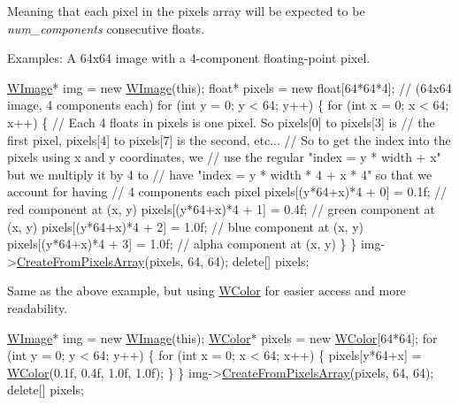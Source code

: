 Meaning that each pixel in the pixels array will be expected to be {\itshape num\+\_\+components} consecutive floats.

Examples\+: A 64x64 image with a 4-\/component floating-\/point pixel. 
\begin{DoxyCode}
\hyperlink{class_w_image}{WImage}* img = \textcolor{keyword}{new} \hyperlink{class_w_image}{WImage}(\textcolor{keyword}{this});
\textcolor{keywordtype}{float}* pixels = \textcolor{keyword}{new} \textcolor{keywordtype}{float}[64*64*4]; \textcolor{comment}{// (64x64 image, 4 components each)}
\textcolor{keywordflow}{for} (\textcolor{keywordtype}{int} y = 0; y < 64; y++) \{
     \textcolor{keywordflow}{for} (\textcolor{keywordtype}{int} x = 0; x < 64; x++) \{
         \textcolor{comment}{// Each 4 floats in pixels is one pixel. So pixels[0] to pixels[3] is}
         \textcolor{comment}{// the first pixel, pixels[4] to pixels[7] is the second, etc...}
         \textcolor{comment}{// So to get the index into the pixels using x and y coordinates, we}
         \textcolor{comment}{// use the regular "index = y * width + x" but we multiply it by 4 to}
         \textcolor{comment}{// have "index = y * width * 4 + x * 4" so that we account for having}
         \textcolor{comment}{// 4 components each pixel}
         pixels[(y*64+x)*4 + 0] = 0.1f; \textcolor{comment}{// red component at (x, y)}
         pixels[(y*64+x)*4 + 1] = 0.4f; \textcolor{comment}{// green component at (x, y)}
         pixels[(y*64+x)*4 + 2] = 1.0f; \textcolor{comment}{// blue component at (x, y)}
         pixels[(y*64+x)*4 + 3] = 1.0f; \textcolor{comment}{// alpha component at (x, y)}
     \}
\}
img->\hyperlink{class_w_image_aa862e77190c45d44bb7f85c533e2f904}{CreateFromPixelsArray}(pixels, 64, 64);
\textcolor{keyword}{delete}[] pixels;
\end{DoxyCode}
 Same as the above example, but using \hyperlink{class_w_color}{W\+Color} for easier access and more readability. 
\begin{DoxyCode}
\hyperlink{class_w_image}{WImage}* img = \textcolor{keyword}{new} \hyperlink{class_w_image}{WImage}(\textcolor{keyword}{this});
\hyperlink{class_w_color}{WColor}* pixels = \textcolor{keyword}{new} \hyperlink{class_w_color}{WColor}[64*64];
\textcolor{keywordflow}{for} (\textcolor{keywordtype}{int} y = 0; y < 64; y++) \{
     \textcolor{keywordflow}{for} (\textcolor{keywordtype}{int} x = 0; x < 64; x++) \{
         pixels[y*64+x] = \hyperlink{class_w_color}{WColor}(0.1f, 0.4f, 1.0f, 1.0f);
     \}
\}
img->\hyperlink{class_w_image_aa862e77190c45d44bb7f85c533e2f904}{CreateFromPixelsArray}(pixels, 64, 64);
\textcolor{keyword}{delete}[] pixels;
\end{DoxyCode}
